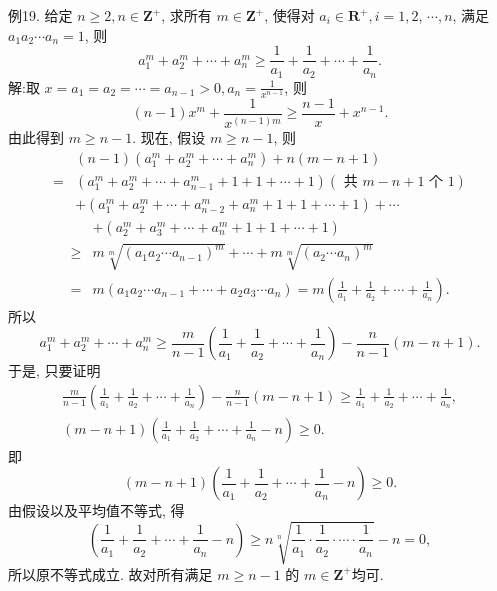 例19. 给定 $n \geqslant 2, n \in \mathbf{Z}^{+}$, 求所有 $m \in \mathbf{Z}^{+}$, 使得对 $a_i \in \mathbf{R}^{+}, i=1,2$, $\cdots, n$, 满足 $a_1 a_2 \cdots a_n=1$, 则
$$
a_1^m+a_2^m+\cdots+a_n^m \geqslant \frac{1}{a_1}+\frac{1}{a_2}+\cdots+\frac{1}{a_n} .
$$
解:取 $x=a_1=a_2=\cdots=a_{n-1}>0, a_n=\frac{1}{x^{n-1}}$, 则
$$
(n-1) x^m+\frac{1}{x^{(n-1) m}} \geqslant \frac{n-1}{x}+x^{n-1} .
$$
由此得到 $m \geqslant n-1$. 现在, 假设 $m \geqslant n-1$, 则
$$
\begin{aligned}
& (n-1)\left(a_1^m+a_2^m+\cdots+a_n^m\right)+n(m-n+1) \\
= & \left(a_1^m+a_2^m+\cdots+a_{n-1}^m+1+1+\cdots+1\right)(\text { 共 } m-n+1 \text { 个 } 1) \\
& +\left(a_1^m+a_2^m+\cdots+a_{n-2}^m+a_n^m+1+1+\cdots+1\right)+\cdots
\end{aligned}
$$
$$
\begin{aligned}
& +\left(a_2^m+a_3^m+\cdots+a_n^m+1+1+\cdots+1\right) \\
\geqslant & m \sqrt[m]{\left(a_1 a_2 \cdots a_{n-1}\right)^m}+\cdots+m \sqrt[m]{\left(a_2 \cdots a_n\right)^m} \\
= & m\left(a_1 a_2 \cdots a_{n-1}+\cdots+a_2 a_3 \cdots a_n\right)=m\left(\frac{1}{a_1}+\frac{1}{a_2}+\cdots+\frac{1}{a_n}\right) .
\end{aligned}
$$
所以
$$
a_1^m+a_2^m+\cdots+a_n^m \geqslant \frac{m}{n-1}\left(\frac{1}{a_1}+\frac{1}{a_2}+\cdots+\frac{1}{a_n}\right)-\frac{n}{n-1}(m-n+1) .
$$
于是, 只要证明
$$
\begin{gathered}
\frac{m}{n-1}\left(\frac{1}{a_1}+\frac{1}{a_2}+\cdots+\frac{1}{a_n}\right)-\frac{n}{n-1}(m-n+1) \geqslant \frac{1}{a_1}+\frac{1}{a_2}+\cdots+\frac{1}{a_n}, \\
(m-n+1)\left(\frac{1}{a_1}+\frac{1}{a_2}+\cdots+\frac{1}{a_n}-n\right) \geqslant 0 .
\end{gathered}
$$
即
$$
(m-n+1)\left(\frac{1}{a_1}+\frac{1}{a_2}+\cdots+\frac{1}{a_n}-n\right) \geqslant 0 .
$$
由假设以及平均值不等式, 得
$$
\left(\frac{1}{a_1}+\frac{1}{a_2}+\cdots+\frac{1}{a_n}-n\right) \geqslant n \sqrt[n]{\frac{1}{a_1} \cdot \frac{1}{a_2} \cdot \cdots \cdot \frac{1}{a_n}}-n=0,
$$
所以原不等式成立.
故对所有满足 $m \geqslant n-1$ 的 $m \in \mathbf{Z}^{+}$均可.



